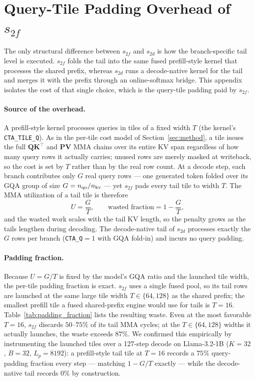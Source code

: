 \documentclass[11pt]{article}
\begin{document}
\section{Query-Tile Padding Overhead of $s_{2f}$}
\label{appendix:padding}

The only structural difference between $s_{2f}$ and $s_{2d}$ is how the
branch-specific tail level is executed. $s_{2f}$ folds the tail into the
same fused prefill-style kernel that processes the shared prefix, whereas
$s_{2d}$ runs a decode-native kernel for the tail and merges it with the
prefix through an online-softmax bridge. This appendix isolates the cost
of that single choice, which is the query-tile padding paid by $s_{2f}$.

\paragraph{Source of the overhead.}
A prefill-style kernel processes queries in tiles of a fixed width $T$
(the kernel's \texttt{CTA\_TILE\_Q}). As in the per-tile cost model of
Section~\ref{sec:method}, a tile issues the full $\mathbf{Q}\mathbf{K}^\top$
and $\mathbf{P}\mathbf{V}$ MMA chains over its entire KV span regardless of
how many query rows it actually carries; unused rows are merely masked at
writeback, so the cost is set by $T$ rather than by the real row count. At
a decode step, each branch contributes only $G$ real query rows --- one
generated token folded over its GQA group of size
$G = n_{\rm qo}/n_{\rm kv}$ --- yet $s_{2f}$ pads every tail tile to width
$T$. The MMA utilization of a tail tile is therefore
\begin{equation}
\label{eq:pad-util}
U = \frac{G}{T},
\qquad
\text{wasted fraction} = 1 - \frac{G}{T},
\end{equation}
and the wasted work scales with the tail KV length, so the penalty grows
as the tails lengthen during decoding. The decode-native tail of $s_{2d}$
processes exactly the $G$ rows per branch (\texttt{CTA\_Q}$=1$ with GQA
fold-in) and incurs no query padding.

\paragraph{Padding fraction.}
Because $U=G/T$ is fixed by the model's GQA ratio and the launched tile
width, the per-tile padding fraction is exact. $s_{2f}$ uses a single
fused pool, so its tail rows are launched at the same large tile width
$T\in\{64,128\}$ as the shared prefix; the smallest prefill tile a fused
shared-prefix engine would use for tails is $T=16$. Table~\ref{tab:padding_fraction}
lists the resulting waste. Even at the most favorable $T=16$, $s_{2f}$
discards $50$--$75\%$ of its tail MMA cycles; at the $T\in\{64,128\}$
widths it actually launches, the waste exceeds $87\%$. We confirmed this
empirically by instrumenting the launched tiles over a 127-step decode on
Llama-3.2-1B ($K=32$, $B=32$, $L_p=8192$): a prefill-style tail tile at
$T=16$ records a $75\%$ query-padding fraction every step --- matching
$1-G/T$ exactly --- while the decode-native tail records $0\%$ by
construction.
\end{document}
